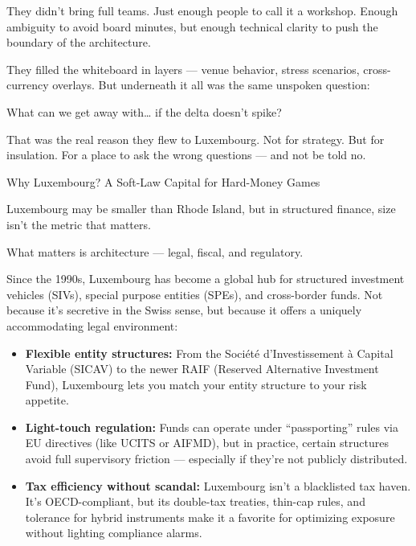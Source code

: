 They didn’t bring full teams. Just enough people to call it a workshop.
Enough ambiguity to avoid board minutes, but enough technical clarity to push the boundary of the architecture.

They filled the whiteboard in layers — venue behavior, stress scenarios, cross-currency overlays.
But underneath it all was the same unspoken question:

What can we get away with… if the delta doesn’t spike?

That was the real reason they flew to Luxembourg.
Not for strategy.
But for insulation.
For a place to ask the wrong questions — and not be told no.

\medskip

\begin{HistoricalSidebar}{Why Luxembourg? A Soft-Law Capital for Hard-Money Games}

    Luxembourg may be smaller than Rhode Island, but in structured finance, size isn’t the metric that matters.

    \medskip
    
    What matters is architecture — legal, fiscal, and regulatory.
    
    \medskip
    
    Since the 1990s, Luxembourg has become a global hub for structured investment vehicles (SIVs), special purpose entities (SPEs), and cross-border funds. Not because it’s secretive in the Swiss sense, but because it offers a uniquely accommodating legal environment:

    \medskip
    
    \begin{itemize}
    \item \textbf{Flexible entity structures:} From the Société d’Investissement à Capital Variable (SICAV) to the newer RAIF (Reserved Alternative Investment Fund), Luxembourg lets you match your entity structure to your risk appetite.
    
    \item \textbf{Light-touch regulation:} Funds can operate under “passporting” rules via EU directives (like UCITS or AIFMD), but in practice, certain structures avoid full supervisory friction — especially if they’re not publicly distributed.
    
    \item \textbf{Tax efficiency without scandal:} Luxembourg isn’t a blacklisted tax haven. It’s OECD-compliant, but its double-tax treaties, thin-cap rules, and tolerance for hybrid instruments make it a favorite for optimizing exposure without lighting compliance alarms.
    \end{itemize}
    

\end{HistoricalSidebar}
